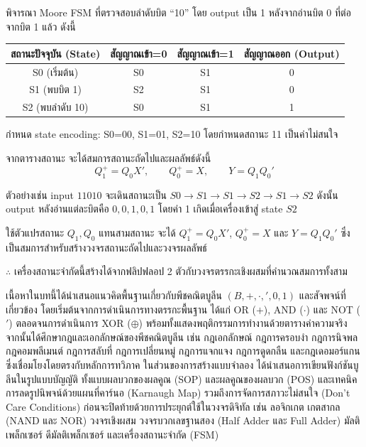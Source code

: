 \begin{ex}
\label{ex:fsm-sequence}
พิจารณา Moore FSM ที่ตรวจสอบลำดับบิต ``10'' โดย output เป็น 1 หลังจากอ่านบิต 0 ที่ต่อจากบิต 1 แล้ว ดังนี้


\begin{center}
\begin{tabular}{|c|c|c|c|}
\hline
สถานะปัจจุบัน (State) & สัญญาณเข้า=0 & สัญญาณเข้า=1 & สัญญาณออก (Output) \\
\hline
S0 (เริ่มต้น) & S0 & S1 & 0 \\
\hline
S1 (พบบิต 1) & S2 & S1 & 0 \\
\hline
S2 (พบลำดับ 10) & S0 & S1 & 1 \\
\hline
\end{tabular}
\end{center}

กำหนด state encoding: S0=00, S1=01, S2=10 โดยกำหนดสถานะ 11 เป็นค่าไม่สนใจ

จากตารางสถานะ จะได้สมการสถานะถัดไปและผลลัพธ์ดังนี้
\[
Q_1^+ = Q_0X', \qquad Q_0^+ = X, \qquad Y = Q_1Q_0'
\]

ตัวอย่างเช่น input $11010$ จะเดินสถานะเป็น $S0 \rightarrow S1 \rightarrow S1 \rightarrow S2 \rightarrow S1 \rightarrow S2$ ดังนั้น output หลังอ่านแต่ละบิตคือ $0,0,1,0,1$ โดยค่า 1 เกิดเมื่อเครื่องเข้าสู่ state $S2$
\end{ex}
\begin{solution}
ใช้ตัวแปรสถานะ $Q_1,Q_0$ แทนสามสถานะ จะได้ $Q_1^+=Q_0X'$, $Q_0^+=X$ และ $Y=Q_1Q_0'$ ซึ่งเป็นสมการสำหรับสร้างวงจรสถานะถัดไปและวงจรผลลัพธ์

$\therefore$ เครื่องสถานะจำกัดนี้สร้างได้จากฟลิปฟลอป 2 ตัวกับวงจรตรรกะเชิงผสมที่คำนวณสมการทั้งสาม \solhere
\end{solution}

\label{sec:chapter-summary-boolean}
เนื้อหาในบทนี้ได้นำเสนอแนวคิดพื้นฐานเกี่ยวกับพีชคณิตบูลีน $(B, +, \cdot, ', 0, 1)$ และสัจพจน์ที่เกี่ยวข้อง โดยเริ่มต้นจากการดำเนินการทางตรรกะพื้นฐาน ได้แก่ OR ($+$), AND ($\cdot$) และ NOT ($'$) ตลอดจนการดำเนินการ XOR ($\oplus$) พร้อมทั้งแสดงพฤติกรรมการทำงานด้วยตารางค่าความจริง จากนั้นได้ศึกษากฎและเอกลักษณ์ของพีชคณิตบูลีน เช่น กฎเอกลักษณ์ กฎการครอบงำ กฎการนิจพล กฎคอมพลีเมนต์ กฎการสลับที่ กฎการเปลี่ยนหมู่ กฎการแจกแจง กฎการดูดกลืน และกฎเดอมอร์แกน ซึ่งเชื่อมโยงโดยตรงกับหลักการทวิภาค ในส่วนของการสร้างแบบจำลอง ได้นำเสนอการเขียนฟังก์ชันบูลีนในรูปแบบบัญญัติ ทั้งแบบผลบวกของผลคูณ (SOP) และผลคูณของผลบวก (POS) และเทคนิคการลดรูปนิพจน์ด้วยแผนที่คาร์นอ (Karnaugh Map) รวมถึงการจัดการสภาวะไม่สนใจ (Don't Care Conditions) ก่อนจะปิดท้ายด้วยการประยุกต์ใช้ในวงจรดิจิทัล เช่น ลอจิกเกต เกตสากล (NAND และ NOR) วงจรเชิงผสม วงจรบวกเลขฐานสอง (Half Adder และ Full Adder) มัลติเพล็กเซอร์ ดีมัลติเพล็กเซอร์ และเครื่องสถานะจำกัด (FSM)

